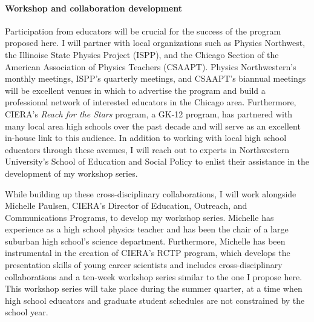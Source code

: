 \documentclass[11pt, preprint]{aastex}
\begin{document}
\paragraph{Workshop and collaboration development}
\label{sct:development}
Participation from educators will be crucial for the success of the program proposed here.
I will partner with local organizations such as Physics Northwest, the Illinoise State Physics Project (ISPP), and the Chicago Section of the American Association of Physics Teachers (CSAAPT).
Physics Northwestern's monthly meetings, ISPP's quarterly meetings, and CSAAPT's biannual meetings will be excellent venues in which to advertise the program and build a professional network of interested educators in the Chicago area.
Furthermore, CIERA's \emph{Reach for the Stars} program, a GK-12 program, has partnered with many local area high schools over the past decade and will serve as an excellent in-house link to this audience.
In addition to working with local high school educators through these avenues, I will reach out to experts in Northwestern University's School of Education and Social Policy to enlist their assistance in the development of my workshop series.

While building up these cross-disciplinary collaborations, I will work alongside Michelle Paulsen, CIERA's Director of Education, Outreach, and Communications Programs, to develop my workshop series.
Michelle has experience as a high school physics teacher and has been the chair of a large suburban high school's science department.
Furthermore, Michelle has been instrumental in the creation of CIERA's RCTP program, which develops the presentation skills of young career scientists and includes cross-disciplinary collaborations and a ten-week workshop series similar to the one I propose here.
This workshop series will take place during the summer quarter, at a time when high school educators and graduate student schedules are not constrained by the school year.
\end{document}
